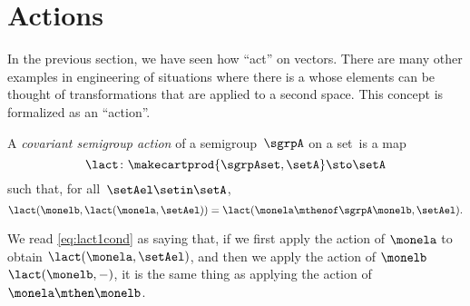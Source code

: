 
\section{Actions}
\label{sec:actions}
In the previous section, we have seen how  ``act'' on vectors.
There are many other examples in engineering of situations where there is a   whose elements can be thought of transformations that are applied to a second space.
This concept is formalized as an ``action''.

\begin{ctdefinition}
    \label{def:semigroup-cov-action-prelim}
    A \emph{covariant semigroup action} of a semigroup~$\sgrpA$ on a set~\setA is a map
    \begin{equation}
        \label{eq:lact}
        \lact \colon \makecartprod{\sgrpAset, \setA} \sto \setA
    \end{equation}
    such that, for all~$\setAel \setin \setA$,
    \begin{equation}
        \label{eq:lact1cond}
        \lact(\monelb, \lact(\monela, \setAel)) = \lact(\monela \mthenof\sgrpA \monelb, \setAel).
    \end{equation}
\end{ctdefinition}

We read \cref{eq:lact1cond} as saying that, if we first apply the action of $\monela$ to obtain $\lact(\monela, \setAel)$,
and then we apply the action of $\monelb$ $\lact(\monelb, -)$, it is the same thing as applying the action of $\monela\mthen\monelb$.


